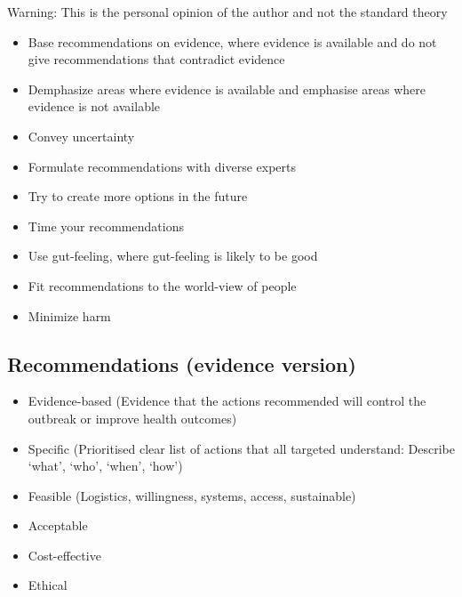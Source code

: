 \documentclass[
  letterpaper,
  DIV=11,
  numbers=noendperiod]{scrreprt}
\providecommand{\tightlist}{%
  \setlength{\itemsep}{0pt}\setlength{\parskip}{0pt}}\usepackage{longtable,booktabs,array}
\begin{document}
\begin{tcolorbox}[enhanced jigsaw, opacitybacktitle=0.6, titlerule=0mm, breakable, bottomrule=.15mm, colframe=quarto-callout-warning-color-frame, toprule=.15mm, left=2mm, colbacktitle=quarto-callout-warning-color!10!white, coltitle=black, colback=white, bottomtitle=1mm, rightrule=.15mm, toptitle=1mm, title=\textcolor{quarto-callout-warning-color}{\faExclamationTriangle}\hspace{0.5em}{Warning}, opacityback=0, arc=.35mm, leftrule=.75mm]

Warning: This is the personal opinion of the author and not the standard
theory

\end{tcolorbox}

\begin{itemize}
\tightlist
\item
  Base recommendations on evidence, where evidence is available and do
  not give recommendations that contradict evidence
\item
  Demphasize areas where evidence is available and emphasise areas where
  evidence is not available
\item
  Convey uncertainty
\item
  Formulate recommendations with diverse experts
\item
  Try to create more options in the future
\item
  Time your recommendations
\item
  Use gut-feeling, where gut-feeling is likely to be good
\item
  Fit recommendations to the world-view of people
\item
  Minimize harm
\end{itemize}

\subsection{Recommendations (evidence version)}

\begin{itemize}
\tightlist
\item
  Evidence-based (Evidence that the actions recommended will control the
  outbreak or improve health outcomes)
\item
  Specific (Prioritised clear list of actions that all targeted
  understand: Describe `what', `who', `when', `how')
\item
  Feasible (Logistics, willingness, systems, access, sustainable)
\item
  Acceptable
\item
  Cost-effective
\item
  Ethical
\end{itemize}
\end{document}
